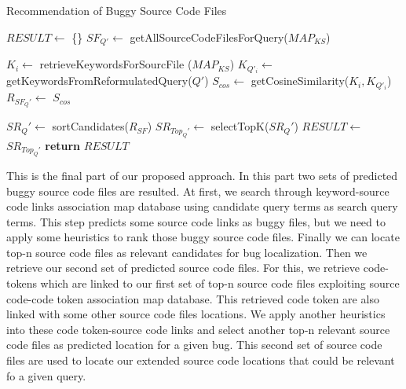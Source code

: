 \documentclass{sig-alternate}
\begin{document}
\begin{algorithm}[!t]
\caption{Recommendation of Buggy Source Code Files}
\label{localization}
\begin{algorithmic}[1]
\State $RESULT \gets$ \{\}
\State $SF_{Q'} \gets$ getAllSourceCodeFilesForQuery($MAP_{KS}$)


\State $K_{i} \gets$ retrieveKeywordsForSourcFile ($MAP_{KS}$)
\State $K_{Q'_i} \gets$ getKeywordsFromReformulatedQuery($Q'$)
\State $S_{cos} \gets$ getCosineSimilarity($K_{i}, K_{Q'_i}$) 
\State $R_{SF_Q'} \gets$ $S_{cos}$

\EndFor
{}
\State $SR_Q' \gets$ sortCandidates($R_{SF}$)
\State $SR_{Top_Q'} \gets$ selectTopK($SR_Q'$)
\State $RESULT \gets$ $SR_{Top_Q'}$ 
\State \textbf{return} $RESULT$
\EndProcedure
\end{algorithmic}
\end{algorithm}


This is the final part of our proposed approach. In this part two sets of predicted buggy source code files are resulted. At first, we search through keyword-source code links association map database using candidate query terms as search query terms. This step predicts some source code links as buggy files, but we need to apply some heuristics to rank those buggy source code files. Finally we can locate top-n source code files as relevant candidates for bug localization. Then we retrieve our second set of predicted source code files. For this, we retrieve code-tokens which are linked to our first set of top-n source code files exploiting source code-code token association map database. This retrieved code token are also linked with some other source code files locations. We apply another heuristics into these code token-source code links and select another top-n relevant source code files as predicted location for a given bug. This second set of source code files are used to locate our extended source code locations that could be relevant fo a given query.
\end{document}
